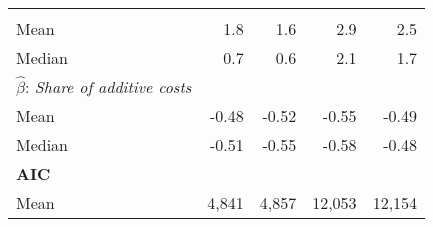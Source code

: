 \begin{tabular}{lllll}
  \multicolumn{1}{|r}{} &
  \multicolumn{1}{r}{} &
  \multicolumn{1}{r}{} &
  \multicolumn{1}{r}{} \\
\multicolumn{1}{l}{\hspace{2em}Mean} &
  \multicolumn{1}{|r}{1.8} &
  \multicolumn{1}{r}{1.6} &
  \multicolumn{1}{r}{2.9} &
  \multicolumn{1}{r}{2.5} \\
\multicolumn{1}{l}{\hspace{2em}Median} &
  \multicolumn{1}{|r}{0.7} &
  \multicolumn{1}{r}{0.6} &
  \multicolumn{1}{r}{2.1} &
  \multicolumn{1}{r}{1.7} \\
\multicolumn{1}{l}{\hspace{1em}$\widehat{\beta}$:  \textit{Share of additive costs}} &
  \multicolumn{1}{|r}{} &
  \multicolumn{1}{r}{} &
  \multicolumn{1}{r}{} &
  \multicolumn{1}{r}{} \\
\multicolumn{1}{l}{\hspace{2em}Mean} &
  \multicolumn{1}{|r}{-0.48} &
  \multicolumn{1}{r}{-0.52} &
  \multicolumn{1}{r}{-0.55} &
  \multicolumn{1}{r}{-0.49} \\
\multicolumn{1}{l}{\hspace{2em}Median} &
  \multicolumn{1}{|r}{-0.51} &
  \multicolumn{1}{r}{-0.55} &
  \multicolumn{1}{r}{-0.58} &
  \multicolumn{1}{r}{-0.48} \\
\multicolumn{1}{l}{{\textbf{AIC}}} &
  \multicolumn{1}{|r}{} &
  \multicolumn{1}{r}{} &
  \multicolumn{1}{r}{} &
  \multicolumn{1}{r}{} \\
\multicolumn{1}{l}{\hspace{1em}Mean} &
  \multicolumn{1}{|r}{4,841} &
  \multicolumn{1}{r}{4,857} &
  \multicolumn{1}{r}{12,053} &
  \multicolumn{1}{r}{12,154} \\
\cline{1-5}
\end{tabular}
